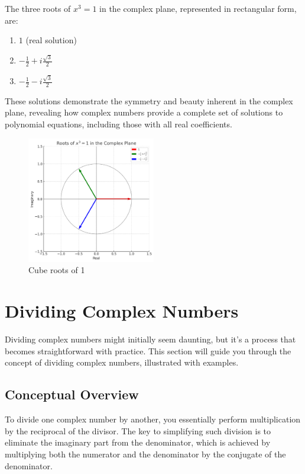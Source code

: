\documentclass[
]{article}
\providecommand{\tightlist}{%
  \setlength{\itemsep}{0pt}\setlength{\parskip}{0pt}}
\let\oldsection\section
\renewcommand{\section}[1]{\clearpage\oldsection{#1}}
\def\tightlist{}
\begin{document}
The three roots of \(x^3 = 1\) in the complex plane, represented in
rectangular form, are:

\begin{enumerate}
\def\labelenumi{\arabic{enumi}.}
\tightlist
\item
  \(1\) (real solution)
\item
  \(-\frac{1}{2} + i\frac{\sqrt{3}}{2}\)
\item
  \(-\frac{1}{2} - i\frac{\sqrt{3}}{2}\)
\end{enumerate}

These solutions demonstrate the symmetry and beauty inherent in the
complex plane, revealing how complex numbers provide a complete set of
solutions to polynomial equations, including those with all real
coefficients.

\begin{figure}
\centering
\includegraphics[width=0.5\textwidth,height=\textheight]{cube-roots-of-one.png}
\caption{Cube roots of 1}
\end{figure}

\section{Dividing Complex Numbers}\label{dividing-complex-numbers}

Dividing complex numbers might initially seem daunting, but it's a
process that becomes straightforward with practice. This section will
guide you through the concept of dividing complex numbers, illustrated
with examples.

\subsection{Conceptual Overview}\label{conceptual-overview}

To divide one complex number by another, you essentially perform
multiplication by the reciprocal of the divisor. The key to simplifying
such division is to eliminate the imaginary part from the denominator,
which is achieved by multiplying both the numerator and the denominator
by the conjugate of the denominator.
\end{document}
